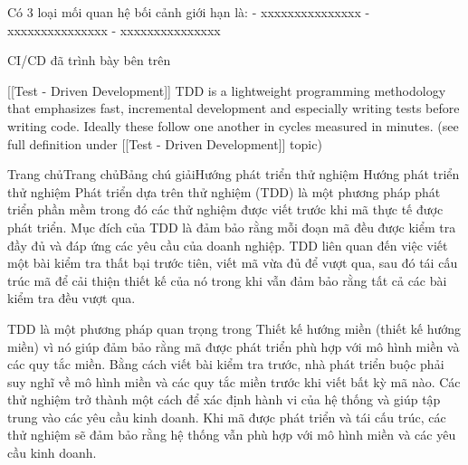 Có 3 loại mối quan hệ bối cảnh giới hạn là:
- xxxxxxxxxxxxxxx
- xxxxxxxxxxxxxxx
- xxxxxxxxxxxxxxx

CI/CD đã trình bày bên trên

[[Test - Driven Development]] TDD is a lightweight programming methodology that emphasizes fast, incremental development and especially writing tests before writing code. Ideally these follow one another in cycles measured in minutes. (see full definition under [[Test - Driven Development]] topic)

Trang chủTrang chủBảng chú giảiHướng phát triển thử nghiệm
Hướng phát triển thử nghiệm
Phát triển dựa trên thử nghiệm (TDD) là một phương pháp phát triển phần mềm trong đó các thử nghiệm được viết trước khi mã thực tế được phát triển. Mục đích của TDD là đảm bảo rằng mỗi đoạn mã đều được kiểm tra đầy đủ và đáp ứng các yêu cầu của doanh nghiệp. TDD liên quan đến việc viết một bài kiểm tra thất bại trước tiên, viết mã vừa đủ để vượt qua, sau đó tái cấu trúc mã để cải thiện thiết kế của nó trong khi vẫn đảm bảo rằng tất cả các bài kiểm tra đều vượt qua.

TDD là một phương pháp quan trọng trong Thiết kế hướng miền (thiết kế hướng miền) vì nó giúp đảm bảo rằng mã được phát triển phù hợp với mô hình miền và các quy tắc miền. Bằng cách viết bài kiểm tra trước, nhà phát triển buộc phải suy nghĩ về mô hình miền và các quy tắc miền trước khi viết bất kỳ mã nào. Các thử nghiệm trở thành một cách để xác định hành vi của hệ thống và giúp tập trung vào các yêu cầu kinh doanh. Khi mã được phát triển và tái cấu trúc, các thử nghiệm sẽ đảm bảo rằng hệ thống vẫn phù hợp với mô hình miền và các yêu cầu kinh doanh.

